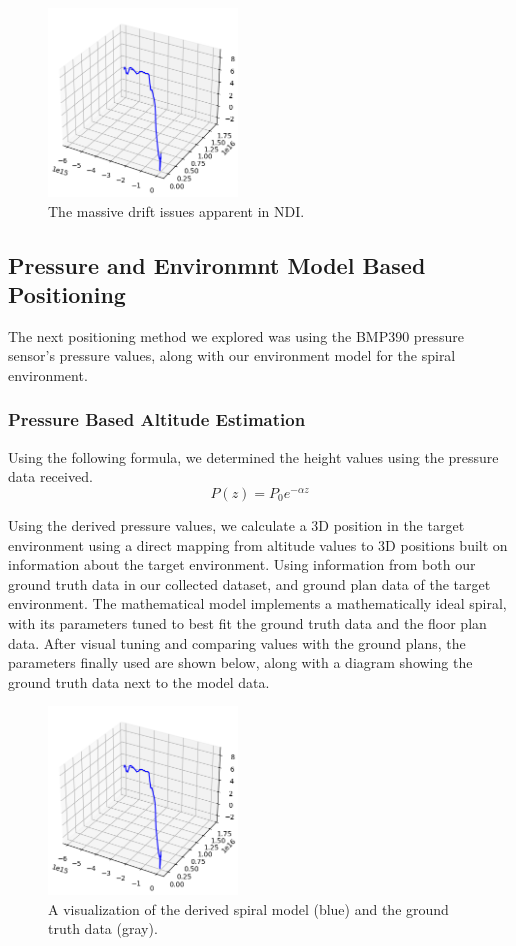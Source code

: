 \begin{figure}[h] 
	\centering \includegraphics[height=5cm]{./images/ndi.png}
	\caption{The massive drift issues apparent in NDI.}
\end{figure}

\subsection{Pressure and Environmnt Model Based Positioning}
The next positioning method we explored was using the BMP390 pressure sensor's pressure values, along with our environment model for the spiral environment.
\subsubsection{Pressure Based Altitude Estimation}
Using the following formula, we determined the height values using the pressure data received.
$$P\left(z\right)=P_0e^{-\alpha z}$$

Using the derived pressure values, we calculate a 3D position in the target environment using a direct mapping from altitude values to 3D positions built on information about the target environment. Using information from both our ground truth data in our collected dataset, and ground plan data of the target environment. The mathematical model implements a mathematically ideal spiral, with its parameters tuned to best fit the ground truth data and the floor plan data. After visual tuning and comparing values with the ground plans, the parameters finally used are shown below, along with a diagram showing the ground truth data next to the model data.

\begin{figure}[h] 
	\centering \includegraphics[height=5cm]{./images/ndi.png}
	\caption{A visualization of the derived spiral model (blue) and the ground truth data (gray).}
\end{figure}

